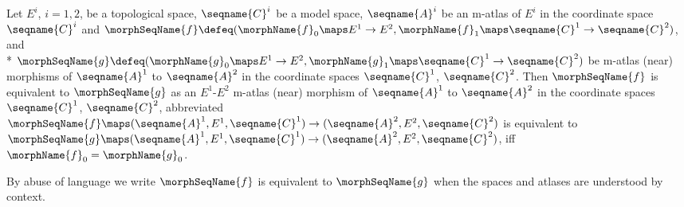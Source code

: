 \documentclass{article}
\begin{document}
\begin{definition}
Let $E^i$, $i=1,2$, be a topological space, $\seqname{C}^i$ be a model
space, $\seqname{A}^i$ be an m-atlas of $E^i$ in the coordinate space
$\seqname{C}^i$ and
$
  \morphSeqName{f} \defeq
  (
    \morphName{f}_0 \maps E^1 \to E^2,
    \morphName{f}_1 \maps \seqname{C}^1 \to \seqname{C}^2
  )
$, and \\*
$
  \morphSeqName{g} \defeq
  (
    \morphName{g}_0 \maps E^1 \to E^2,
    \morphName{g}_1 \maps \seqname{C}^1 \to \seqname{C}^2
  )
$
be m-atlas (near) morphisms of $\seqname{A}^1$ to $\seqname{A}^2$ in the
coordinate spaces $\seqname{C}^1$, $\seqname{C}^2$.
Then $\morphSeqName{f}$ is equivalent to $\morphSeqName{g}$ as an
$E^1$-$E^2$ m-atlas (near) morphism  of $\seqname{A}^1$ to
$\seqname{A}^2$ in the coordinate spaces $\seqname{C}^1$,
$\seqname{C}^2$, abbreviated
$
  \morphSeqName{f} \maps
  (\seqname{A}^1, E^1, \seqname{C}^1) \to
  (\seqname{A}^2, E^2, \seqname{C}^2)
$
is equivalent to
$
  \morphSeqName{g} \maps
  (\seqname{A}^1, E^1, \seqname{C}^1) \to
  (\seqname{A}^2, E^2, \seqname{C}^2)
$,
iff $\morphName{f}_0 = \morphName{g}_0$.

By abuse of language we write $\morphSeqName{f}$ is equivalent to
$\morphSeqName{g}$ when the spaces and atlases are understood by context.
\end{definition}
\end{document}
